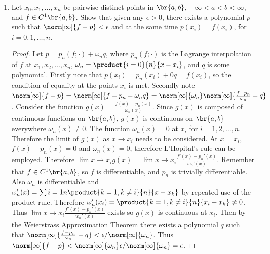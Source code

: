 \documentclass[11pt]{article}
\begin{document}
\begin{enumerate}
    \item %
        Let $x_0, x_1, \ldots, x_n$ be pairwise distinct points in $\br{a, b}$,
        $-\infty < a < b < \infty$, and $f \in C^1\br{a, b}$.
        Show that given any $\epsilon > 0$, there exists a polynomial $p$ such
        that $\norm[\infty]{f - p} < \epsilon$ and at the same time $p(x_i) =
        f(x_i)$, for $i = 0, 1, \ldots, n$.
        \begin{proof}
            Let $p = p_n(f;\cdot) + \omega_n q$, where $p_n(f;\cdot)$ is the
            Lagrange interpolation of $f$ at $x_1, x_2, \ldots, x_n$,
            $\omega_n = \product{i=0}{n}{x - x_i}$, and $q$ is some polynomial.
            Firstly note that $p(x_i) = p_n(x_i) + 0 q = f(x_i)$, so the condition
            of equality at the points $x_i$ is met.
            Secondly note $\norm[\infty]{f - p} =
            \norm[\infty]{f - p_n - \omega_n q} = \norm[\infty]{\omega_n}
            \norm[\infty]{\frac{f - p_n}{\omega_n} - q}$.
            Consider the function $g(x) = \frac{f(x) - p_n(x)}{\omega_n(x)}$.
            Since $g(x)$ is composed of continuous functions on $\br{a, b}$,
            $g(x)$ is continuous on $\br{a, b}$ everywhere $\omega_n(x) \neq 0$.
            The function $\omega_n(x) = 0$ at $x_i$ for $i = 1, 2, \ldots, n$.
            Therefore the limit of $g(x)$ as $x \to x_i$ needs to be considered.
            At $x = x_i$, $f(x) - p_n(x) = 0$ and $\omega_n(x) = 0$, therefore
            L'Hopital's rule can be employed.
            Therefore $\lim{x \to x_i}{g(x)} =
            \lim{x \to x_i}{\frac{f'(x)- p_n'(x)}{w_n'(x)}}$.
            Remember that $f \in C^1\br{a, b}$, so $f$ is differentiable, and
            $p_n$ is trivially differentiable.
            Also $\omega_n$ is differentiable and $\omega_n'(x) =
            \sum{i = 1}{n}{\product{k = 1, k \neq i}{n}{x - x_k}}$ by repeated
            use of the product rule.
            Therefore $\omega_n'(x_i) = \product{k=1, k \neq i}{n}{x_i - x_k} \neq 0$.
            Thus $\lim{x \to x_i}{\frac{f'(x)- p_n'(x)}{w_n'(x)}}$ exists so
            $g(x)$ is continuous at $x_i$.
            Then by the Weierstrass Approximation Theorem there exists a polynomial
            $q$ such that $\norm[\infty]{\frac{f - p_n}{\omega_n} - q} <
            \epsilon/\norm[\infty]{\omega_n}$.
            Thus $\norm[\infty]{f - p} < 
            \norm[\infty]{\omega_n} \epsilon/\norm[\infty]{\omega_n} = \epsilon$.
        \end{proof}


\end{enumerate}
\end{document}
